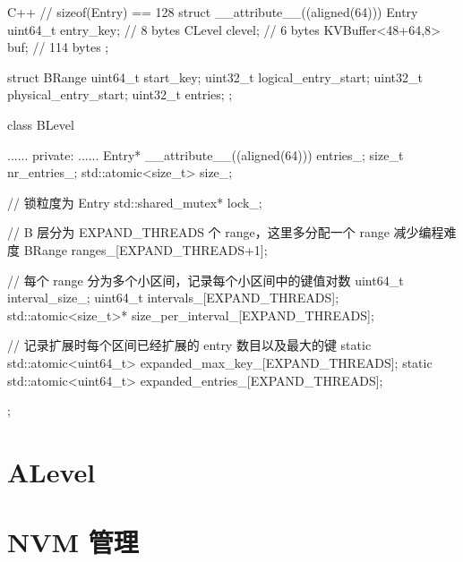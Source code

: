 \documentclass{mydoc}
\begin{document}
\begin{codes}{C++}
// sizeof(Entry) == 128
struct __attribute__((aligned(64))) Entry {
  uint64_t entry_key;     // 8 bytes
  CLevel clevel;          // 6 bytes
  KVBuffer<48+64,8> buf;  // 114 bytes
};

struct BRange {
  uint64_t start_key;
  uint32_t logical_entry_start;
  uint32_t physical_entry_start;
  uint32_t entries;
};

class BLevel {
  ......
 private:
  ......
  Entry* __attribute__((aligned(64))) entries_;
  size_t nr_entries_;
  std::atomic<size_t> size_;

  // 锁粒度为 Entry
  std::shared_mutex* lock_;

  // B 层分为 EXPAND_THREADS 个 range，这里多分配一个 range 减少编程难度
  BRange ranges_[EXPAND_THREADS+1];

  // 每个 range 分为多个小区间，记录每个小区间中的键值对数
  uint64_t interval_size_;
  uint64_t intervals_[EXPAND_THREADS];
  std::atomic<size_t>* size_per_interval_[EXPAND_THREADS];

  // 记录扩展时每个区间已经扩展的 entry 数目以及最大的键
  static std::atomic<uint64_t> expanded_max_key_[EXPAND_THREADS];
  static std::atomic<uint64_t> expanded_entries_[EXPAND_THREADS];
};
\end{codes}

\section{ALevel}

\section{NVM 管理}
\end{document}

